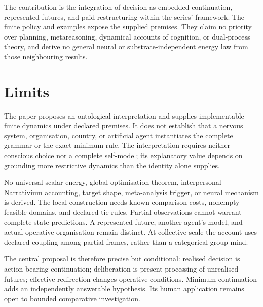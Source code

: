 \documentclass[11pt,a4paper]{article}
\theoremstyle{remark}
\begin{document}
The contribution is the integration of decision as embedded continuation,
represented futures, and paid restructuring within the series' framework.
The finite policy and examples expose the supplied premises. They claim no
priority over planning, metareasoning, dynamical accounts of cognition, or
dual-process theory, and derive no general neural or substrate-independent
energy law from those neighbouring results.

\section{Limits}\label{sec:limits}

The paper proposes an ontological interpretation and supplies implementable
finite dynamics under declared premises. It does not establish that a nervous
system, organisation, country, or artificial agent instantiates the complete
grammar or the exact minimum rule. The interpretation requires neither
conscious choice nor a complete self-model; its explanatory value depends on
grounding more restrictive dynamics than the identity alone supplies.

No universal scalar energy, global optimisation theorem, interpersonal
Narrativium accounting, target shape, meta-analysis trigger, or neural mechanism
is derived. The local construction needs known comparison costs, nonempty
feasible domains, and declared tie rules. Partial observations cannot warrant
complete-state predictions. A represented future, another agent's model, and
actual operative organisation remain distinct. At collective scale the account
uses declared coupling among partial frames, rather than a categorical group
mind.

The central proposal is therefore precise but conditional: realised decision
is action-bearing continuation; deliberation is present processing of
unrealised futures; effective redirection changes operative conditions.
Minimum continuation adds an independently answerable hypothesis. Its human
application remains open to bounded comparative investigation.
\end{document}
